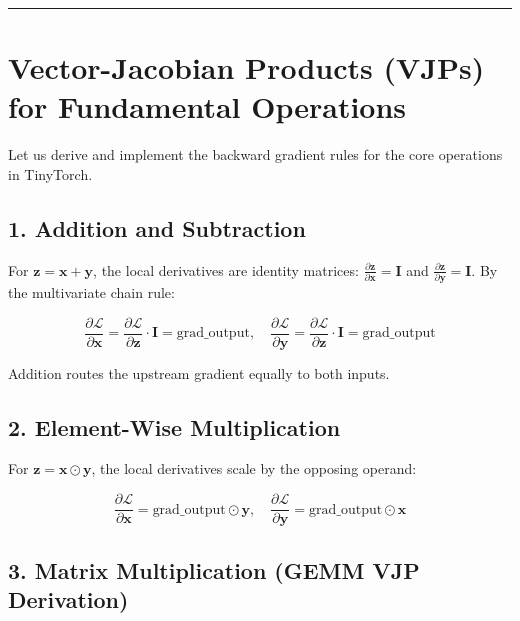 \documentclass[
  letterpaper,
]{scrbook}
\begin{document}
\begin{center}\rule{0.5\linewidth}{0.5pt}\end{center}

\section{Vector-Jacobian Products (VJPs) for Fundamental
Operations}\label{vector-jacobian-products-vjps-for-fundamental-operations}

Let us derive and implement the backward gradient rules for the core
operations in TinyTorch.

\subsection{1. Addition and Subtraction}\label{addition-and-subtraction}

For \(\mathbf{z} = \mathbf{x} + \mathbf{y}\), the local derivatives are
identity matrices:
\(\frac{\partial \mathbf{z}}{\partial \mathbf{x}} = \mathbf{I}\) and
\(\frac{\partial \mathbf{z}}{\partial \mathbf{y}} = \mathbf{I}\). By the
multivariate chain rule:

\[\frac{\partial \mathcal{L}}{\partial \mathbf{x}} = \frac{\partial \mathcal{L}}{\partial \mathbf{z}} \cdot \mathbf{I} = \text{grad\_output}, \quad \frac{\partial \mathcal{L}}{\partial \mathbf{y}} = \frac{\partial \mathcal{L}}{\partial \mathbf{z}} \cdot \mathbf{I} = \text{grad\_output}\]

Addition routes the upstream gradient equally to both inputs.

\subsection{2. Element-Wise
Multiplication}\label{element-wise-multiplication}

For \(\mathbf{z} = \mathbf{x} \odot \mathbf{y}\), the local derivatives
scale by the opposing operand:

\[\frac{\partial \mathcal{L}}{\partial \mathbf{x}} = \text{grad\_output} \odot \mathbf{y}, \quad \frac{\partial \mathcal{L}}{\partial \mathbf{y}} = \text{grad\_output} \odot \mathbf{x}\]

\subsection{3. Matrix Multiplication (GEMM VJP
Derivation)}\label{matrix-multiplication-gemm-vjp-derivation}
\end{document}
